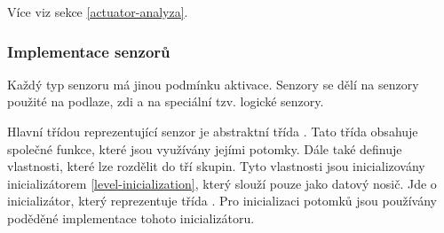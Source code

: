 Více viz sekce \ref{actuator-analyza}.

\subsubsection{Implementace senzorů}

Každý typ senzoru má jinou podmínku aktivace. Senzory se dělí na senzory použité na podlaze, zdi a
na speciální tzv. logické senzory.

Hlavní třídou reprezentující senzor je abstraktní třída . Tato třída obsahuje společné funkce,
které jsou využívány jejími potomky. Dále také definuje vlastnosti, které lze rozdělit do tří skupin.
Tyto vlastnosti jsou inicializovány inicializátorem \vref{level-inicialization}, který slouží pouze jako datový nosič.
Jde o inicializátor, který reprezentuje třída . Pro inicializaci potomků jsou 
používány poděděné implementace tohoto inicializátoru.

